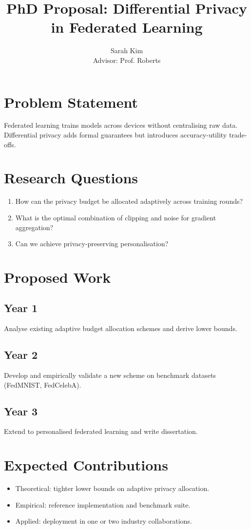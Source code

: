 \documentclass[11pt]{article}
\title{PhD Proposal: Differential Privacy in Federated Learning}
\author{Sarah Kim \\ Advisor: Prof. Roberts}
\begin{document}
\maketitle

\section{Problem Statement}
Federated learning trains models across devices without centralising raw data. Differential privacy adds formal guarantees but introduces accuracy-utility trade-offs.

\section{Research Questions}
\begin{enumerate}
  \item How can the privacy budget be allocated adaptively across training rounds?
  \item What is the optimal combination of clipping and noise for gradient aggregation?
  \item Can we achieve privacy-preserving personalisation?
\end{enumerate}

\section{Proposed Work}

\subsection{Year 1}
Analyse existing adaptive budget allocation schemes and derive lower bounds.

\subsection{Year 2}
Develop and empirically validate a new scheme on benchmark datasets (FedMNIST, FedCelebA).

\subsection{Year 3}
Extend to personalised federated learning and write dissertation.

\section{Expected Contributions}
\begin{itemize}
  \item Theoretical: tighter lower bounds on adaptive privacy allocation.
  \item Empirical: reference implementation and benchmark suite.
  \item Applied: deployment in one or two industry collaborations.
\end{itemize}
\end{document}
